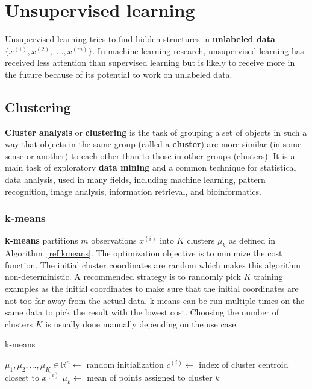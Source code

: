 \documentclass{report}
\begin{document}
\chapter{Unsupervised learning}
Unsupervised learning tries to find hidden structures in {\bf unlabeled data} $\{x^{(1)}, x^{(2)},$ $..., x^{(m)}\}$. In machine learning research, unsupervised learning has received less attention than supervised learning but is likely to receive more in the future because of its potential to work on unlabeled data.

\section{Clustering}
{\bf Cluster analysis} or {\bf clustering} is the task of grouping a set of objects in such a way that objects in the same group (called a {\bf cluster}) are more similar (in some sense or another) to each other than to those in other groups (clusters).
It is a main task of exploratory {\bf data mining} and a common technique for statistical data analysis, used in many fields, including machine learning, pattern recognition, image analysis, information retrieval, and bioinformatics.


\subsection{k-means}
{\bf k-means} partitions $m$ observations $x^{(i)}$ into $K$ clusters $\mu_k$ as defined in Algorithm~\ref{ref:kmeans}. The optimization objective is to minimize the cost function. The initial cluster coordinates are random which makes this algorithm non-deterministic. A recommended strategy is to randomly pick $K$ training examples as the initial coordinates to make sure that the initial coordinates are not too far away from the actual data. k-means can be run multiple times on the same data to pick the result with the lowest cost. Choosing the number of clusters $K$ is usually done manually depending on the use case.

\begin{algorithm}
\caption{k-means}
\label{ref:kmeans}
\begin{algorithmic}
\State $\mu_1, \mu_2, ..., \mu_K \in \mathbb{R}^n \gets$ random initialization
\Repeat
{}
\State $c^{(i)} \gets$ index of cluster centroid closest to $x^{(i)}$
\EndFor
{}
\State $\mu_k \gets$ mean of points assigned to cluster $k$
\EndFor
{}
\end{algorithmic}
\end{algorithm}
\end{document}
